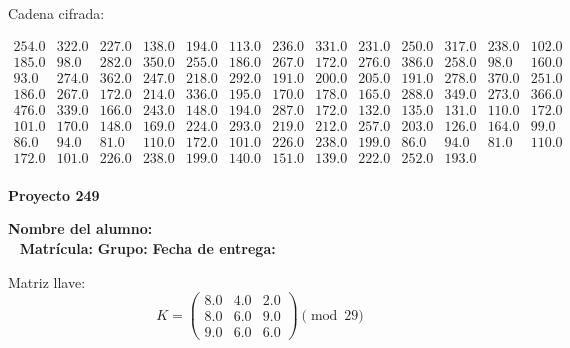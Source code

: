 \documentclass[12pt]{article}
\begin{document}
Cadena cifrada:
\begin{center}
$\begin{array}{lllllllllllll}
254.0 & 322.0 & 227.0 & 138.0 & 194.0 & 113.0 & 236.0 & 331.0 & 231.0 & 250.0 & 317.0 & 238.0 & 102.0\\
185.0 & 98.0 & 282.0 & 350.0 & 255.0 & 186.0 & 267.0 & 172.0 & 276.0 & 386.0 & 258.0 & 98.0 & 160.0\\
93.0 & 274.0 & 362.0 & 247.0 & 218.0 & 292.0 & 191.0 & 200.0 & 205.0 & 191.0 & 278.0 & 370.0 & 251.0\\
186.0 & 267.0 & 172.0 & 214.0 & 336.0 & 195.0 & 170.0 & 178.0 & 165.0 & 288.0 & 349.0 & 273.0 & 366.0\\
476.0 & 339.0 & 166.0 & 243.0 & 148.0 & 194.0 & 287.0 & 172.0 & 132.0 & 135.0 & 131.0 & 110.0 & 172.0\\
101.0 & 170.0 & 148.0 & 169.0 & 224.0 & 293.0 & 219.0 & 212.0 & 257.0 & 203.0 & 126.0 & 164.0 & 99.0\\
86.0 & 94.0 & 81.0 & 110.0 & 172.0 & 101.0 & 226.0 & 238.0 & 199.0 & 86.0 & 94.0 & 81.0 & 110.0\\
172.0 & 101.0 & 226.0 & 238.0 & 199.0 & 140.0 & 151.0 & 139.0 & 222.0 & 252.0 & 193.0\\
\end{array}$
\end{center}

\newpage


\textbf{Proyecto 249}

\textbf{Nombre del alumno:} \underline{\hspace{13cm}}\\\
\vspace{1cm}
\textbf{Matrícula:} \underline{\hspace{4cm}} \hspace{1cm}
\textbf{Grupo:} \underline{\hspace{2cm}}
\textbf{Fecha de entrega:} \underline{\hspace{2cm}}

\medskip

Matriz llave:
\[
K = \begin{pmatrix}
8.0 & 4.0 & 2.0\\
8.0 & 6.0 & 9.0\\
9.0 & 6.0 & 6.0
\end{pmatrix} \pmod{29}
\]
\end{document}
